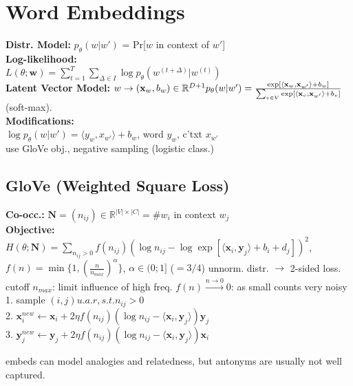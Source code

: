 \section{Word Embeddings}
\textbf{Distr. Model:} $p_\theta(w|w')$ = Pr[$w$ in context of $w'$]\\
\textbf{Log-likelihood:}\\
$L(\theta; \mathbf{w}) = \sum_{t=1}^T\sum_{\Delta \in I}{\log p_\theta(w^{(t+\Delta)}|w^{(t)})}$\\
\textbf{Latent Vector Model:} $w \rightarrow (\mathbf{x}_w, b_w) \in \mathbb{R}^{D+1} \\p_{\theta}(w|w') = \frac{\exp[\langle \mathbf{x}_w,\mathbf{x}_{w'}\rangle + b_w]}{\sum_{v\in V}{\exp[\langle \mathbf{x}_v,\mathbf{x}_{w'}\rangle + b_v ]}}$ (soft-max).\\
\textbf{Modifications:}\\
$\log p_{\theta}(w|w') = \langle  y_{w} , x_{w'} \rangle + b_w$,  word $y_w$, c'txt $x_{w'}$\\
use GloVe obj., negative sampling (logistic class.)

\subsection*{GloVe (Weighted Square Loss)}
\textbf{Co-occ.:} $\mathbf{N} = (n_{ij}) \in \mathbb{R}^{|V|\times|C|} = \# w_i$ in context $w_j$\\ \textbf{Objective:} $H(\theta;\mathbf{N})= \sum_{n_{ij} > 0} f(n_{ij})(\log n_{ij} - \log \exp[\langle \mathbf{x}_i, \mathbf{y}_j \rangle + b_i + d_j])^2$, $f(n) = \min\{1, (\frac{n}{n_{max}})^\alpha\}$, $\alpha \in (0;1]$ ($ = 3/4$) unnorm. distr. $\rightarrow$ 2-sided loss. 
cutoff $n_{max}$: limit influence of high freq. $f(n)\stackrel{n\rightarrow0}{\rightarrow}0$: as small counts very noisy\\
1. sample $(i,j) u.a.r, s.t. n_{ij}>0$\\
2. $\mathbf{x}_i^{new} \leftarrow \mathbf{x}_i + 2\eta f(n_{ij})(\log n_{ij} - \langle \mathbf{x}_i, \mathbf{y}_j \rangle)\mathbf{y}_j$\\
3. $\mathbf{y}_j^{new} \leftarrow \mathbf{y}_j + 2\eta f(n_{ij})(\log n_{ij} - \langle \mathbf{x}_i, \mathbf{y}_j \rangle)\mathbf{x}_i$
\par embeds can model analogies and relatedness, but antonyms are usually not well captured.
